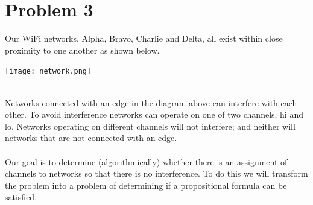 \documentclass{article}
\newcommand*\fixindent{ \hspace{1pt}\\}
\begin{document}
\newpage
\section{Problem 3}
\begin{flushleft}
Our WiFi networks, Alpha, Bravo, Charlie and Delta, all exist within close proximity to one another as shown below.\\
\end{flushleft}
\begin{centering}\texttt{[image: network.png]}
\end{centering}
\fixindent{}
Networks connected with an edge in the diagram above can interfere with each other. To avoid interference networks can operate on one of two channels, hi and lo. Networks operating on different channels will not interfere; and neither will networks that are not connected with an edge.\\\\
Our goal is to determine (algorithmically) whether there is an assignment of channels to networks so that there is no interference. To do this we will transform the problem into a problem of determining if a propositional formula can be satisfied.\\\\\\
\end{document}
